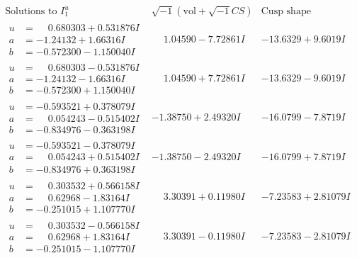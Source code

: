 \documentclass[1p]{elsarticle_modified}
\theoremstyle{definition}
\newcommand{\I}{\sqrt{-1}}
\begin{document}
$$\begin{array}{c|c|c}  
\text{Solutions to }I^u_{1}& \I (\text{vol} + \sqrt{-1}CS) & \text{Cusp shape}\\
 \hline 
\begin{aligned}
u &= \phantom{-}0.680303 + 0.531876 I \\
a &= -1.24132 + 1.66316 I \\
b &= -0.572300 - 1.150040 I\end{aligned}
 & \phantom{-}1.04590 - 7.72861 I & -13.6329 + 9.6019 I \\ \hline\begin{aligned}
u &= \phantom{-}0.680303 - 0.531876 I \\
a &= -1.24132 - 1.66316 I \\
b &= -0.572300 + 1.150040 I\end{aligned}
 & \phantom{-}1.04590 + 7.72861 I & -13.6329 - 9.6019 I \\ \hline\begin{aligned}
u &= -0.593521 + 0.378079 I \\
a &= \phantom{-}0.054243 - 0.515402 I \\
b &= -0.834976 - 0.363198 I\end{aligned}
 & -1.38750 + 2.49320 I & -16.0799 - 7.8719 I \\ \hline\begin{aligned}
u &= -0.593521 - 0.378079 I \\
a &= \phantom{-}0.054243 + 0.515402 I \\
b &= -0.834976 + 0.363198 I\end{aligned}
 & -1.38750 - 2.49320 I & -16.0799 + 7.8719 I \\ \hline\begin{aligned}
u &= \phantom{-}0.303532 + 0.566158 I \\
a &= \phantom{-}0.62968 - 1.83164 I \\
b &= -0.251015 + 1.107770 I\end{aligned}
 & \phantom{-}3.30391 + 0.11980 I & -7.23583 + 2.81079 I \\ \hline\begin{aligned}
u &= \phantom{-}0.303532 - 0.566158 I \\
a &= \phantom{-}0.62968 + 1.83164 I \\
b &= -0.251015 - 1.107770 I\end{aligned}
 & \phantom{-}3.30391 - 0.11980 I & -7.23583 - 2.81079 I \\ \hline\begin{aligned}

\end{aligned}
\end{array}$$
\end{document}
